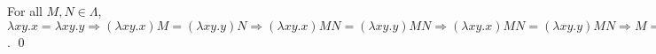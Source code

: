 \begin{pf} \rm
For all $M,N\in\Lambda$, $ \lambda xy.x = \lambda xy.y
\Rightarrow
  (\lambda xy.x)M = (\lambda xy.y)N
\Rightarrow
  (\lambda xy.x)MN = (\lambda xy.y)MN
\Rightarrow
  (\lambda xy.x)MN = (\lambda xy.y)MN
\Rightarrow
  M = (\lambda xy.y)MN
\Rightarrow
  M=N
$. \qed
\end{pf}
